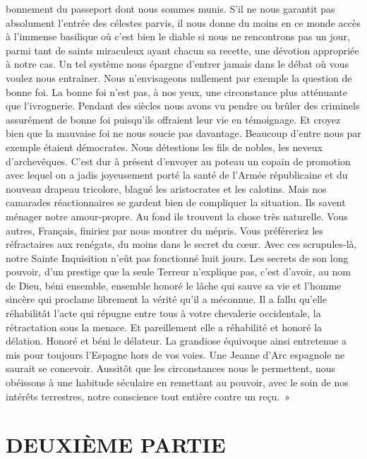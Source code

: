 \documentclass[french,twoside]{book} %
\begin{document}
bonnement du passeport dont nous sommes munis. S’il ne nous garantit pas absolument l’entrée des célestes parvis, il nous donne du moins en ce monde accès à l’immense basilique où c’est bien le diable si nous ne rencontrons pas un jour, parmi tant de saints miraculeux ayant chacun sa recette, une dévotion appropriée à notre cas. Un tel système nous épargne d’entrer jamais dans le débat où vous voulez nous entraîner. Nous n’envisageons nullement par exemple la question de bonne foi. La bonne foi n’est pas, à nos yeux, une circonstance plus atténuante que l’ivrognerie. Pendant des siècles nous avons vu pendre ou brûler des criminels assurément de bonne foi puisqu’ils offraient leur vie en témoignage. Et croyez bien que la mauvaise foi ne nous soucie pas davantage. Beaucoup d’entre nous par exemple étaient démocrates. Nous détestions les fils de nobles, les neveux d’archevêques. C’est dur à présent d’envoyer au poteau un copain de promotion avec lequel on a jadis joyeusement porté la santé de l’Armée républicaine et du nouveau drapeau tricolore, blagué les aristocrates et les calotins. Mais nos camarades réactionnaires se gardent bien de compliquer la situation. Ils savent ménager notre amour-propre. Au fond ils trouvent la chose très naturelle. Vous autres, Français, finiriez par nous montrer du mépris. Vous préféreriez les réfractaires aux renégats, du moins dans le secret du cœur. Avec ces scrupules-là, notre Sainte Inquisition n’eût pas fonctionné huit jours. Les secrets de son long pouvoir, d’un prestige que la seule Terreur n’explique pas, c’est d’avoir, au nom de Dieu, béni ensemble, ensemble honoré le lâche qui sauve sa vie et l’homme sincère qui proclame librement la vérité qu’il a méconnue. Il a fallu qu’elle réhabilitât l’acte qui répugne entre tous à votre chevalerie occidentale, la rétractation sous la menace. Et pareillement elle a réhabilité et honoré la délation. Honoré et béni le délateur. La grandiose équivoque ainsi entretenue a mis pour toujours l’Espagne hors de vos voies. Une Jeanne d’Arc espagnole ne saurait se concevoir. Aussitôt que les circonstances nous le permettent, nous obéissons à une habitude séculaire en remettant au pouvoir, avec le soin de nos intérêts terrestres, notre conscience tout entière contre un reçu. »
\section[{DEUXIÈME PARTIE}]{DEUXIÈME PARTIE}\renewcommand{\leftmark}{DEUXIÈME PARTIE}
\end{document}
